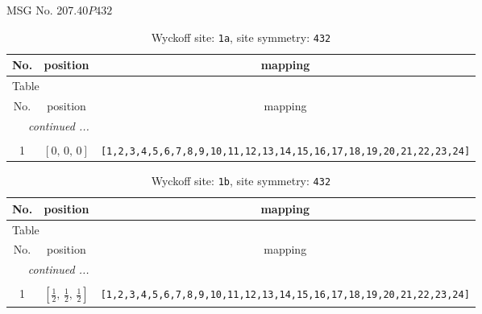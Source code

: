 \documentclass[fleqn,8pt]{jsarticle}
\begin{document}
\setcounter{MaxMatrixCols}{32}

\renewcommand{\tablename}{Table~}
\renewcommand{\figurename}{Figure~}
\begin{center}
\LARGE
MSG No. 207.40\quad$P432$
\end{center}
\renewcommand{\arraystretch}{1.2}
\begin{longtable}{ccc}
\caption{Wyckoff site: {\tt 1a}, site symmetry: {\tt 432}}
 \\
 \hline \hline
No. & position & mapping \\ \hline \endfirsthead

\multicolumn{2}{l}{\tablename\ \thetable{}} \\
 \hline \hline
No. & position & mapping \\ \hline \endhead

 \hline \hline
\multicolumn{2}{r}{\footnotesize\it continued ...} \\ \endfoot

 \hline \hline
\multicolumn{2}{r}{} \\ \endlastfoot

1 & $\left[ 0,\, 0,\, 0 \right]$ & {\tt [1,2,3,4,5,6,7,8,9,10,11,12,13,14,15,16,17,18,19,20,21,22,23,24]} \\
\end{longtable}
\renewcommand{\arraystretch}{1.2}
\begin{longtable}{ccc}
\caption{Wyckoff site: {\tt 1b}, site symmetry: {\tt 432}}
 \\
 \hline \hline
No. & position & mapping \\ \hline \endfirsthead

\multicolumn{2}{l}{\tablename\ \thetable{}} \\
 \hline \hline
No. & position & mapping \\ \hline \endhead

 \hline \hline
\multicolumn{2}{r}{\footnotesize\it continued ...} \\ \endfoot

 \hline \hline
\multicolumn{2}{r}{} \\ \endlastfoot

1 & $\left[ \frac{1}{2},\, \frac{1}{2},\, \frac{1}{2} \right]$ & {\tt [1,2,3,4,5,6,7,8,9,10,11,12,13,14,15,16,17,18,19,20,21,22,23,24]} \\
\end{longtable}
\renewcommand{\arraystretch}{1.2}
\end{document}
